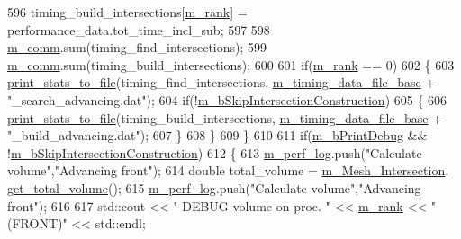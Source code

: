 \begin{DoxyCode}
596             timing\_build\_intersections[\hyperlink{classcarl_1_1_intersection___search_a82564dfb7815673fcb9d9e3eb2d03b97}{m\_rank}] = performance\_data.tot\_time\_incl\_sub;
597 
598             \hyperlink{classcarl_1_1_intersection___search_a69fe381ecd45f4cdcb4810294aa88eaa}{m\_comm}.sum(timing\_find\_intersections);
599             \hyperlink{classcarl_1_1_intersection___search_a69fe381ecd45f4cdcb4810294aa88eaa}{m\_comm}.sum(timing\_build\_intersections);
600 
601             \textcolor{keywordflow}{if}(\hyperlink{classcarl_1_1_intersection___search_a82564dfb7815673fcb9d9e3eb2d03b97}{m\_rank} == 0)
602             \{
603                 \hyperlink{namespacecarl_a87ce5fcb102a26f69dbef740667eb08b}{print\_stats\_to\_file}(timing\_find\_intersections,
      \hyperlink{classcarl_1_1_intersection___search_aea1aa01a86b5cdb7bea5ac9e7f73105f}{m\_timing\_data\_file\_base} + \textcolor{stringliteral}{"\_search\_advancing.dat"});
604                 \textcolor{keywordflow}{if}(!\hyperlink{classcarl_1_1_intersection___search_aef626956ac007f4c737aba3f2f69f2de}{m\_bSkipIntersectionConstruction})
605                 \{
606                     \hyperlink{namespacecarl_a87ce5fcb102a26f69dbef740667eb08b}{print\_stats\_to\_file}(timing\_build\_intersections,
      \hyperlink{classcarl_1_1_intersection___search_aea1aa01a86b5cdb7bea5ac9e7f73105f}{m\_timing\_data\_file\_base} + \textcolor{stringliteral}{"\_build\_advancing.dat"});
607                 \}
608             \}
609         \}
610 
611         \textcolor{keywordflow}{if}(\hyperlink{classcarl_1_1_intersection___search_af69485e014f8178ec6c6dcbd95bf9dc9}{m\_bPrintDebug} && !\hyperlink{classcarl_1_1_intersection___search_aef626956ac007f4c737aba3f2f69f2de}{m\_bSkipIntersectionConstruction})
612         \{
613             \hyperlink{classcarl_1_1_intersection___search_aebe6210287a36909206b1a59f9cd17e0}{m\_perf\_log}.push(\textcolor{stringliteral}{"Calculate volume"},\textcolor{stringliteral}{"Advancing front"});
614             \textcolor{keywordtype}{double} total\_volume = \hyperlink{classcarl_1_1_intersection___search_a4946b764d66e3f26f323c5d043551c66}{m\_Mesh\_Intersection}.
      \hyperlink{classcarl_1_1_mesh___intersection_a67f126ec639724230b32916b59af4933}{get\_total\_volume}();
615             \hyperlink{classcarl_1_1_intersection___search_aebe6210287a36909206b1a59f9cd17e0}{m\_perf\_log}.push(\textcolor{stringliteral}{"Calculate volume"},\textcolor{stringliteral}{"Advancing front"});
616 
617             std::cout << \textcolor{stringliteral}{"    DEBUG volume on proc. "} << \hyperlink{classcarl_1_1_intersection___search_a82564dfb7815673fcb9d9e3eb2d03b97}{m\_rank} << \textcolor{stringliteral}{"(FRONT)"} << std::endl;

\end{DoxyCode}
